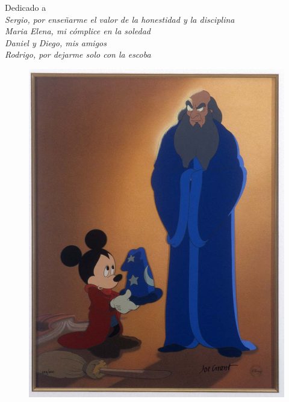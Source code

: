 \thispagestyle{empty}
{}

\vspace*{2cm}


\begin{center}
    Dedicado a \\ \medskip
    {\it
        Sergio, por enseñarme el valor de la honestidad y la disciplina \\ \smallskip
        Maria Elena, mi cómplice en la soledad \\ \smallskip
        Daniel y Diego, mis amigos \\ \smallskip
    Rodrigo, por dejarme solo con la escoba}

\end{center}

\vspace*{1cm}

\begin{center}
    \begin{figure}[h!]
        \includegraphics[width=1.0\textwidth]{fantasia}
    \end{figure}
\end{center}
\null

